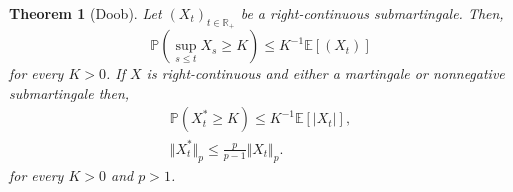 \documentclass[12pt]{article}
\newtheorem{theorem}{Theorem}
\begin{document}
\begin{theorem}[Doob]
Let $(X_t)_{t\in\mathbb{R}_+}$ be a right-continuous submartingale. Then,
\begin{equation*}
\mathbb{P}\left(\sup_{s\le t}X_s\ge K\right)\le K^{-1}\mathbb{E}[(X_t)]
\end{equation*}
for every $K>0$.
If $X$ is right-continuous and either a martingale or nonnegative submartingale then,
\begin{gather*}
\mathbb{P}(X^*_t\ge K)\le K^{-1}\mathbb{E}[|X_t|],\\
\Vert X^*_t\Vert_p\le \frac{p}{p-1}\Vert X_t\Vert_p. 
\end{gather*}
for every $K>0$ and $p>1$.
\end{theorem}

\end{document}
